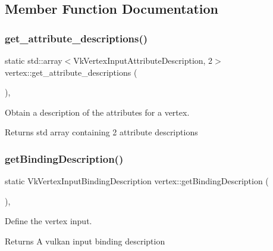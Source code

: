 \subsection{Member Function Documentation}
\mbox{\label{structvertex_a0ee611b52cc36a4f5014a1fb6230cbc6}} 
\subsubsection{\texorpdfstring{get\+\_\+attribute\+\_\+descriptions()}{get\_attribute\_descriptions()}}
{\footnotesize\ttfamily static std\+::array$<$Vk\+Vertex\+Input\+Attribute\+Description, 2$>$ vertex\+::get\+\_\+attribute\+\_\+descriptions (\begin{DoxyParamCaption}{ }\end{DoxyParamCaption})\hspace{0.3cm}{\ttfamily [inline]}, {\ttfamily [static]}}



Obtain a description of the attributes for a vertex. 

\begin{DoxyReturn}{Returns}
std array containing 2 attribute descriptions 
\end{DoxyReturn}
\mbox{\label{structvertex_a82fe1d8d34f8c58ee60dde244401ca55}} 
\subsubsection{\texorpdfstring{get\+Binding\+Description()}{getBindingDescription()}}
{\footnotesize\ttfamily static Vk\+Vertex\+Input\+Binding\+Description vertex\+::get\+Binding\+Description (\begin{DoxyParamCaption}{ }\end{DoxyParamCaption})\hspace{0.3cm}{\ttfamily [inline]}, {\ttfamily [static]}}



Define the vertex input. 

\begin{DoxyReturn}{Returns}
A vulkan input binding description 
\end{DoxyReturn}


